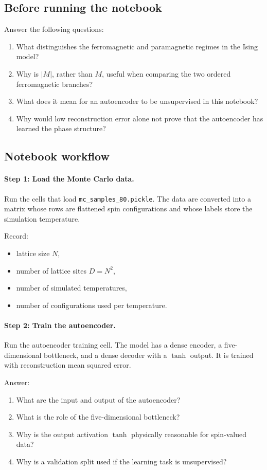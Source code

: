 \documentclass[11pt]{article}
\begin{document}
\subsection*{Before running the notebook}
Answer the following questions:
\begin{enumerate}
    \item What distinguishes the ferromagnetic and paramagnetic regimes in the Ising model?
    \item Why is \(|M|\), rather than \(M\), useful when comparing the two ordered ferromagnetic branches?
    \item What does it mean for an autoencoder to be unsupervised in this notebook?
    \item Why would low reconstruction error alone not prove that the autoencoder has learned the phase structure?
\end{enumerate}

\subsection*{Notebook workflow}

\paragraph{Step 1: Load the Monte Carlo data.}
Run the cells that load \texttt{mc\_samples\_80.pickle}. The data are converted into a matrix whose rows are flattened spin configurations and whose labels store the simulation temperature.

Record:
\begin{itemize}
    \item lattice size \(N\),
    \item number of lattice sites \(D=N^2\),
    \item number of simulated temperatures,
    \item number of configurations used per temperature.
\end{itemize}

\paragraph{Step 2: Train the autoencoder.}
Run the autoencoder training cell. The model has a dense encoder, a five-dimensional bottleneck, and a dense decoder with a \(\tanh\) output. It is trained with reconstruction mean squared error.

Answer:
\begin{enumerate}
    \item What are the input and output of the autoencoder?
    \item What is the role of the five-dimensional bottleneck?
    \item Why is the output activation \(\tanh\) physically reasonable for spin-valued data?
    \item Why is a validation split used if the learning task is unsupervised?
\end{enumerate}
\end{document}
